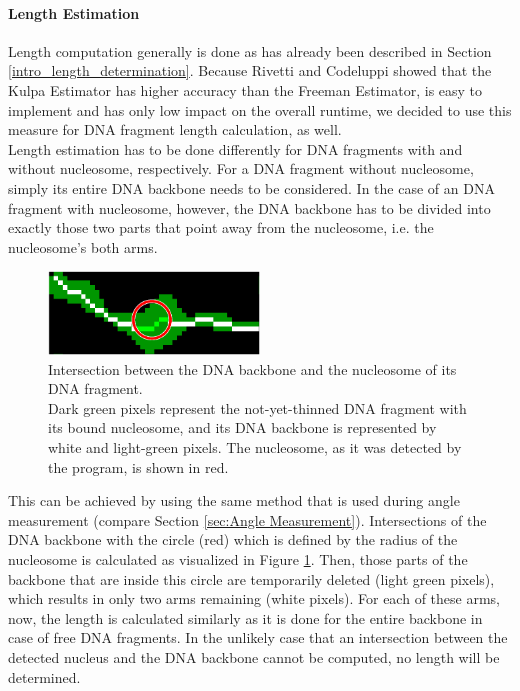 \documentclass{article}
\begin{document}
\paragraph{Length Estimation}\label{sec:Length Estimation}
Length computation generally is done as has already been described in Section \ref{intro_length_determination}. Because Rivetti and Codeluppi \cite{rivetti2001accurate} showed that the Kulpa Estimator has higher accuracy than the Freeman Estimator, is easy to implement and has only low impact on the overall runtime, we decided to use this measure for DNA fragment length calculation, as well.\\
Length estimation has to be done differently for DNA fragments with and without nucleosome, respectively. For a DNA fragment without nucleosome, simply its entire DNA backbone needs to be considered. In the case of an DNA fragment with nucleosome, however, the DNA backbone has to be divided into exactly those two parts that point away from the nucleosome, i.e. the nucleosome's both arms. 
\begin{figure}[htb!]
	\centering
	\includegraphics[width = 0.5\textwidth]{length_calc_two_arms.png}
	\caption{Intersection between the DNA backbone and the nucleosome of its DNA fragment.\\
		Dark green pixels represent the not-yet-thinned DNA fragment with its bound nucleosome, and its DNA backbone is represented by white and light-green pixels. The nucleosome, as it was detected by the program, is shown in red.}
	\label{fig: length_calc_two_arms}
\end{figure}
This can be achieved by using the same method that is used during angle measurement (compare Section \ref{sec:Angle Measurement}). Intersections of the DNA backbone with the circle (red) which is defined by the radius of the nucleosome is calculated as visualized in Figure \ref{fig: length_calc_two_arms}. Then, those parts of the backbone that are inside this circle are temporarily deleted (light green pixels), which results in only two arms remaining (white pixels). For each of these arms, now, the length is calculated similarly as it is done for the entire backbone in case of free DNA fragments. In the unlikely case that an intersection between the detected nucleus and the DNA backbone cannot be computed, no length will be determined.
\end{document}

